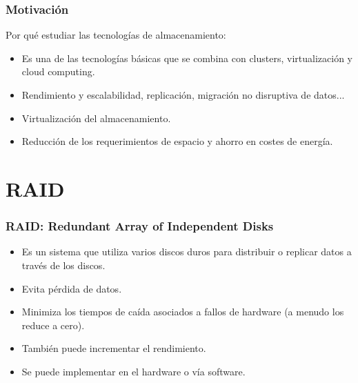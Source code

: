 \documentclass{beamer}
\begin{document}


\normalsize


\begin{frame}
  \frametitle{Motivación}

Por qué estudiar las tecnologías de almacenamiento:

  \begin{itemize}
    \item Es una de las tecnologías básicas que se combina con clusters, virtualización y cloud computing. 
    \item Rendimiento y escalabilidad, replicación, migración no disruptiva de datos...
    \item Virtualización del almacenamiento.
    \item Reducción de los requerimientos de espacio y ahorro en costes de energía. 
  \end{itemize}
\end{frame}


\section{RAID}

\begin{frame}
  \frametitle{RAID: Redundant Array of Independent Disks}
  \begin{itemize}
    \item Es un sistema que utiliza varios discos duros para distribuir o replicar datos a través de los discos.
    \item Evita pérdida de datos.
    \item Minimiza los tiempos de caída asociados a fallos de hardware (a menudo los reduce a cero).
    \item También puede incrementar el rendimiento.
    \item Se puede implementar en el hardware o vía software.
  \end{itemize}
\end{frame}
\end{document}
